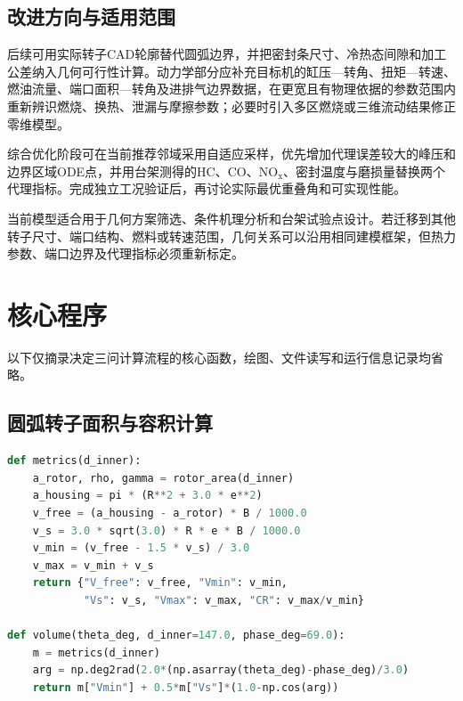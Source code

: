 \documentclass[withoutpreface,bwprint]{cumcmthesis}
\begin{document}
\subsection{改进方向与适用范围}

后续可用实际转子CAD轮廓替代圆弧边界，并把密封条尺寸、冷热态间隙和加工公差纳入几何可行性计算。动力学部分应补充目标机的缸压—转角、扭矩—转速、燃油流量、端口面积—转角及进排气边界数据，在更宽且有物理依据的参数范围内重新辨识燃烧、换热、泄漏与摩擦参数；必要时引入多区燃烧或三维流动结果修正零维模型。

综合优化阶段可在当前推荐邻域采用自适应采样，优先增加代理误差较大的峰压和边界区域ODE点，并用台架测得的HC、CO、$\mathrm{NO_x}$、密封温度与磨损量替换两个代理指标。完成独立工况验证后，再讨论实际最优重叠角和可实现性能。

当前模型适合用于几何方案筛选、条件机理分析和台架试验点设计。若迁移到其他转子尺寸、端口结构、燃料或转速范围，几何关系可以沿用相同建模框架，但热力参数、端口边界及代理指标必须重新标定。




\appendix

\section{核心程序}
\label{app:core-code}
以下仅摘录决定三问计算流程的核心函数，绘图、文件读写和运行信息记录均省略。

\subsection{圆弧转子面积与容积计算}
\begin{lstlisting}[language=Python]
def metrics(d_inner):
    a_rotor, rho, gamma = rotor_area(d_inner)
    a_housing = pi * (R**2 + 3.0 * e**2)
    v_free = (a_housing - a_rotor) * B / 1000.0
    v_s = 3.0 * sqrt(3.0) * R * e * B / 1000.0
    v_min = (v_free - 1.5 * v_s) / 3.0
    v_max = v_min + v_s
    return {"V_free": v_free, "Vmin": v_min,
            "Vs": v_s, "Vmax": v_max, "CR": v_max/v_min}

def volume(theta_deg, d_inner=147.0, phase_deg=69.0):
    m = metrics(d_inner)
    arg = np.deg2rad(2.0*(np.asarray(theta_deg)-phase_deg)/3.0)
    return m["Vmin"] + 0.5*m["Vs"]*(1.0-np.cos(arg))
\end{lstlisting}
\end{document}
